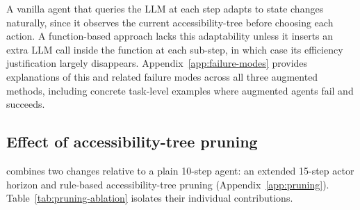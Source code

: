 A vanilla agent that queries the LLM at each step adapts to state changes naturally, since it observes the current accessibility-tree before choosing each action.
A function-based approach lacks this adaptability unless it inserts an extra LLM call inside the function at each sub-step, in which case its efficiency justification largely disappears.
Appendix~\ref{app:failure-modes} provides explanations of this and related failure modes across all three augmented methods, including concrete task-level examples where augmented agents fail and \budgetactor{} succeeds.

\subsection{Effect of accessibility-tree pruning}
\label{sec:pruning-ablation}

\budgetactor{} combines two changes relative to a plain 10-step agent: an extended 15-step actor horizon and rule-based accessibility-tree pruning (Appendix~\ref{app:pruning}).
Table~\ref{tab:pruning-ablation} isolates their individual contributions.

